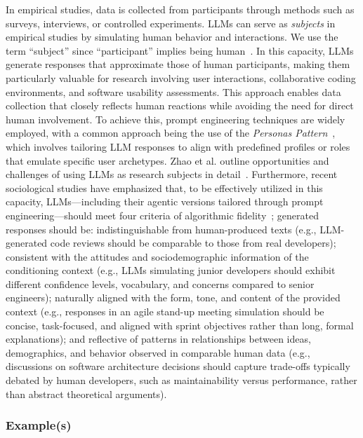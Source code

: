 In empirical studies, data is collected from participants through methods such as surveys, interviews, or controlled experiments.
LLMs can serve as \emph{subjects} in empirical studies by simulating human behavior and interactions.
We use the term ``subject'' since ``participant'' implies being human~\cite{apa-dict-subject}.
In this capacity, LLMs generate responses that approximate those of human participants, making them particularly valuable for research involving user interactions, collaborative coding environments, and software usability assessments.
This approach enables data collection that closely reflects human reactions while avoiding the need for direct human involvement.
To achieve this, prompt engineering techniques are widely employed, with a common approach being the use of the \textit{Personas Pattern}~\cite{DBLP:journals/corr/abs-2308-07702}, which involves tailoring LLM responses to align with predefined profiles or roles that emulate specific user archetypes.
Zhao et al. outline opportunities and challenges of using LLMs as research subjects in detail~\cite{ZHAO2025101167}.
Furthermore, recent sociological studies have emphasized that, to be effectively utilized in this capacity, LLMs---including their agentic versions tailored through prompt engineering---should meet four criteria of algorithmic fidelity~\cite{DBLP:journals/corr/abs-2209-06899}; generated responses should be: indistinguishable from human-produced texts (e.g., LLM-generated code reviews should be comparable to those from real developers); consistent with the attitudes and sociodemographic information of the conditioning context (e.g., LLMs simulating junior developers should exhibit different confidence levels, vocabulary, and concerns compared to senior engineers); naturally aligned with the form, tone, and content of the provided context (e.g., responses in an agile stand-up meeting simulation should be concise, task-focused, and aligned with sprint objectives rather than long, formal explanations); and reflective of patterns in relationships between ideas, demographics, and behavior observed in comparable human data (e.g., discussions on software architecture decisions should capture trade-offs typically debated by human developers, such as maintainability versus performance, rather than abstract theoretical arguments).

\subsubsection{Example(s)}

